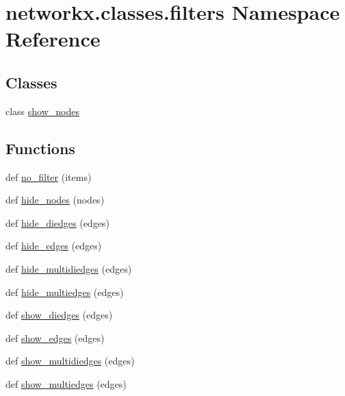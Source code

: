 \hypertarget{namespacenetworkx_1_1classes_1_1filters}{}\section{networkx.\+classes.\+filters Namespace Reference}
\label{namespacenetworkx_1_1classes_1_1filters}
\subsection*{Classes}
\begin{DoxyCompactItemize}
\item 
class \hyperlink{classnetworkx_1_1classes_1_1filters_1_1show__nodes}{show\+\_\+nodes}
\end{DoxyCompactItemize}
\subsection*{Functions}
\begin{DoxyCompactItemize}
\item 
def \hyperlink{namespacenetworkx_1_1classes_1_1filters_aff72578648ba6ba03a5ef6dbb0233a6c}{no\+\_\+filter} (items)
\item 
def \hyperlink{namespacenetworkx_1_1classes_1_1filters_a0ae61c16b88a2723a786129c977ad9d3}{hide\+\_\+nodes} (nodes)
\item 
def \hyperlink{namespacenetworkx_1_1classes_1_1filters_add8c29222436b1dd06767e606fbbd70d}{hide\+\_\+diedges} (edges)
\item 
def \hyperlink{namespacenetworkx_1_1classes_1_1filters_ad8a166a3835bb61a67375b3044a86e23}{hide\+\_\+edges} (edges)
\item 
def \hyperlink{namespacenetworkx_1_1classes_1_1filters_a5f0000d27c26a010df5ef36d56c58469}{hide\+\_\+multidiedges} (edges)
\item 
def \hyperlink{namespacenetworkx_1_1classes_1_1filters_aa29702b134506bcff637d1f268694a2d}{hide\+\_\+multiedges} (edges)
\item 
def \hyperlink{namespacenetworkx_1_1classes_1_1filters_a6e7eb9b5c3ddf5e668626b8ded2f0969}{show\+\_\+diedges} (edges)
\item 
def \hyperlink{namespacenetworkx_1_1classes_1_1filters_a16c262c1c3abc9afd5649025ef8b3cd9}{show\+\_\+edges} (edges)
\item 
def \hyperlink{namespacenetworkx_1_1classes_1_1filters_ae731d3ee5564859a8edd9c09ec28cba2}{show\+\_\+multidiedges} (edges)
\item 
def \hyperlink{namespacenetworkx_1_1classes_1_1filters_ad65d9cd1af7f69cf381888c06085e006}{show\+\_\+multiedges} (edges)
\end{DoxyCompactItemize}



